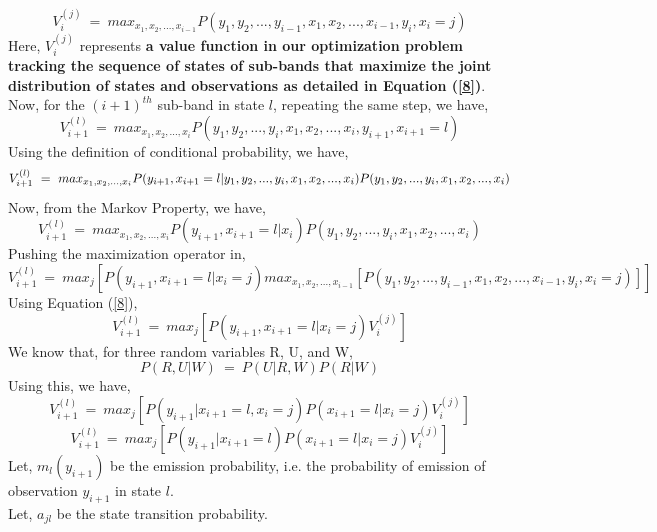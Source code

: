 \documentclass[12pt, draftcls, onecolumn]{IEEEtran}
\begin{document}
\begin{equation}\label{8}
    V_{i}^{(j)}\ =\ max_{x_1,x_2,...,x_{i-1}}P(y_1,y_2,...,y_{i-1},x_1,x_2,...,x_{i-1},y_i,x_{i}=j)
\end{equation}
Here, $V_{i}^{(j)}$ represents \textbf{a value function in our optimization problem tracking the sequence of states of sub-bands that maximize the joint distribution of states and observations as detailed in Equation (\ref{8})}.
\\Now, for the $(i+1)^{th}$ sub-band in state $l$, repeating the same step, we have,
\begin{equation}\label{9}
    V_{i+1}^{(l)}\ =\ max_{x_1,x_2,...,x_i}P(y_1,y_2,...,y_i,x_1,x_2,...,x_i,y_{i+1},x_{i+1}=l)
\end{equation}
Using the definition of conditional probability, we have,
\begin{equation}\label{10}
    V_{i+1}^{(l)}\ =\ max_{x_1,x_2,...,x_i}P(y_{i+1},x_{i+1}=l|y_1,y_2,...,y_i,x_1,x_2,...,x_i)\\P(y_1,y_2,...,y_i,x_1,x_2,...,x_i)
\end{equation}
Now, from the Markov Property, we have,
\begin{equation}\label{11}
    V_{i+1}^{(l)}\ =\ max_{x_1,x_2,...,x_i}P(y_{i+1},x_{i+1}=l|x_i)P(y_1,y_2,...,y_i,x_1,x_2,...,x_i)
\end{equation}
Pushing the maximization operator in,
\begin{equation}\label{12}
    V_{i+1}^{(l)}\ =\ max_{j}[P(y_{i+1},x_{i+1}=l|x_i=j)max_{x_1,x_2,...,x_{i-1}}[P(y_1,y_2,...,y_{i-1},x_1,x_2,...,x_{i-1},y_i,x_i=j)]]
\end{equation}
Using Equation (\ref{8}),
\begin{equation}\label{13}
    V_{i+1}^{(l)}\ =\ max_{j}[P(y_{i+1},x_{i+1}=l|x_i=j)V_i^{(j)}]
\end{equation}
We know that, for three random variables R, U, and W,
\[P(R,U|W)\ =\ P(U|R,W)P(R|W)\]
Using this, we have,
\begin{equation}\label{14}
    V_{i+1}^{(l)}\ =\ max_{j}[P(y_{i+1}|x_{i+1}=l,x_i=j)P(x_{i+1}=l|x_i=j)V_i^{(j)}]
\end{equation}
\begin{equation}\label{15}
    V_{i+1}^{(l)}\ =\ max_{j}[P(y_{i+1}|x_{i+1}=l)P(x_{i+1}=l|x_i=j)V_i^{(j)}]
\end{equation}
Let, $m_l(y_{i+1})$ be the emission probability, i.e. the probability of emission of observation $y_{i+1}$ in state $l$.
\\Let, $a_{jl}$ be the state transition probability.
\end{document}
